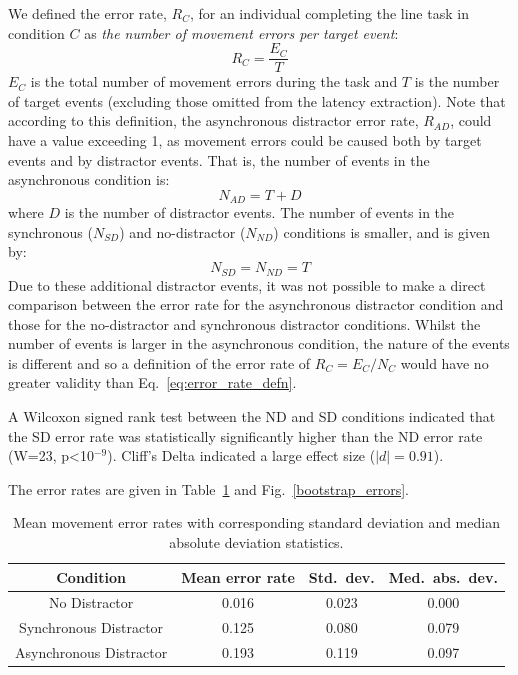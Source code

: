 \documentclass[10pt,letterpaper]{article}
\begin{document}
We defined the error rate, $R_{C}$, for an individual completing
the line task in condition $C$ as \emph{the number of movement errors
  per target event}:
%
\begin{equation}\label{eq:error_rate_defn}
R_{C} = \frac{E_{C}}{T}
\end{equation}
%
$E_{C}$ is the total number of movement errors during the task
and $T$ is the number of target events (excluding those
omitted from the latency extraction).
%
Note that according to this definition, the asynchronous distractor
error rate, $R_{AD}$, could have a value exceeding 1, as movement
errors could be caused both by target events and by distractor
events. That is, the number of events in the asynchronous condition is:
%
\begin{equation}\label{eq:num_events_async}
N_{AD} = T + D
\end{equation}
%
where $D$ is the number of distractor events. The number of events in
the synchronous ($N_{SD}$) and no-distractor ($N_{ND}$) conditions is
smaller, and is given by:
%
\begin{equation}\label{eq:num_events_sync}
N_{SD} = N_{ND} = T
\end{equation}
%
Due to these additional distractor events, it was not possible to make
a direct comparison between the error rate for the asynchronous
distractor condition and those for the no-distractor and synchronous
distractor conditions. Whilst the number of events is larger in the
asynchronous condition, the nature of the events is different and so a
definition of the error rate of $R_{C} = {E_C}/{N_C}$ would have
no greater validity than Eq.~\ref{eq:error_rate_defn}.

A Wilcoxon signed
rank test between the ND and SD conditions indicated that the SD error
rate was statistically significantly higher than the ND error rate
(W=23, p\textless10$^{-9}$). Cliff's Delta indicated a large effect
size ($|d|=0.91$).

The error rates are given in Table~\ref{table:error_rates} and
Fig.~\ref{bootstrap_errors}.

\begin{table}[ht]
\caption{Mean movement error rates with corresponding standard
  deviation and median absolute deviation statistics.}
\centering
\begin{tabular}{c c c c}
\hline
\textbf{Condition} & \textbf{Mean error rate} & \textbf{Std.~dev.} & \textbf{Med.~abs.~dev.} \\ [0.5ex]
\hline
No Distractor & 0.016 & 0.023 & 0.000 \\
Synchronous Distractor & 0.125 & 0.080 & 0.079 \\
Asynchronous Distractor & 0.193 & 0.119 & 0.097 \\ [1ex]
\hline
\end{tabular}
\label{table:error_rates}
\end{table}
\end{document}
